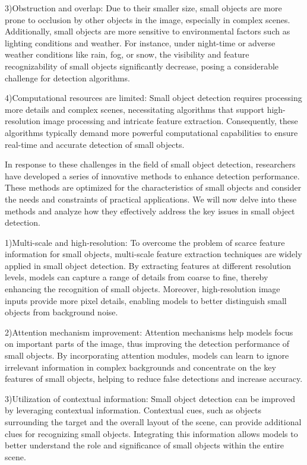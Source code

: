 \documentclass[journal]{IEEEtran}
\begin{document}
  3)Obstruction and overlap: Due to their smaller size, small objects are more prone to occlusion by other objects in the image, especially in complex scenes. Additionally, small objects are more sensitive to environmental factors such as lighting conditions and weather. For instance, under night-time or adverse weather conditions like rain, fog, or snow, the visibility and feature recognizability of small objects significantly decrease, posing a considerable challenge for detection algorithms.
  
  4)Computational resources are limited: Small object detection requires processing more details and complex scenes, necessitating algorithms that support high-resolution image processing and intricate feature extraction. Consequently, these algorithms typically demand more powerful computational capabilities to ensure real-time and accurate detection of small objects.
  
In response to these challenges in the field of small object detection, researchers have developed a series of innovative methods to enhance detection performance. These methods are optimized for the characteristics of small objects and consider the needs and constraints of practical applications. We will now delve into these methods and analyze how they effectively address the key issues in small object detection.

  1)Multi-scale and high-resolution: To overcome the problem of scarce feature information for small objects, multi-scale feature extraction techniques are widely applied in small object detection. By extracting features at different resolution levels, models can capture a range of details from coarse to fine, thereby enhancing the recognition of small objects. Moreover, high-resolution image inputs provide more pixel details, enabling models to better distinguish small objects from background noise.
  
  2)Attention mechanism improvement: Attention mechanisms help models focus on important parts of the image, thus improving the detection performance of small objects. By incorporating attention modules, models can learn to ignore irrelevant information in complex backgrounds and concentrate on the key features of small objects, helping to reduce false detections and increase accuracy.
  
  3)Utilization of contextual information: Small object detection can be improved by leveraging contextual information. Contextual cues, such as objects surrounding the target and the overall layout of the scene, can provide additional clues for recognizing small objects. Integrating this information allows models to better understand the role and significance of small objects within the entire scene.
  
\end{document}
